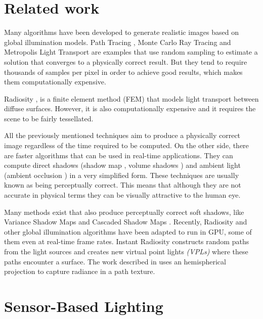 \documentclass[10pt, conference]{IEEEtran}
\begin{document}
\section{Related work}
%
Many algorithms have been developed to generate realistic images based on global illumination models. 
Path Tracing \cite{The_rendering_equation}, Monte Carlo Ray Tracing \cite{Montecarlo_Ray_tracing} and Metropolis Light Transport \cite{Metropolis_light_transport} are examples that use random sampling to 
estimate a solution that converges to a physically correct result. But they tend to require thousands of samples per pixel in order to 
achieve good results, which makes them computationally expensive.\

Radiosity \cite{radiosity}, is a finite element method (FEM) that models light transport between diffuse surfaces.
However, it is also computationally expensive and it requires the scene to be fairly tessellated.\

All the previously mentioned techniques aim to produce a physically correct image regardless of the time required to be computed.
On the other side, there are faster algorithms that can be used in real-time applications. 
They can compute direct shadows (shadow map \cite{shadow_map}, volume shadows  \cite{real_time_shadows}) and ambient light (ambient occlusion \cite{ambient_occlusion}) 
in a very simplified form. These techniques are usually known as being perceptually correct.
This means that although they are not accurate in physical terms they can be visually attractive to the human eye.\

Many methods exist that also produce perceptually correct soft shadows, like Variance Shadow Maps \cite{shadow_map} and Cascaded Shadow Maps \cite{real_time_shadows}.
Recently, Radiosity and other global illumination algorithms have been adapted to run in GPU, some of them even at real-time frame rates.
Instant Radiosity \cite{instant_radiosity} constructs random paths from the light sources and creates new virtual point lights \emph{(VPLs)} where these paths encounter a surface.
The work described in \cite{gpu_gems_2} uses an hemispherical projection to capture radiance in a path texture.





\section{Sensor-Based Lighting}
%
\end{document}
